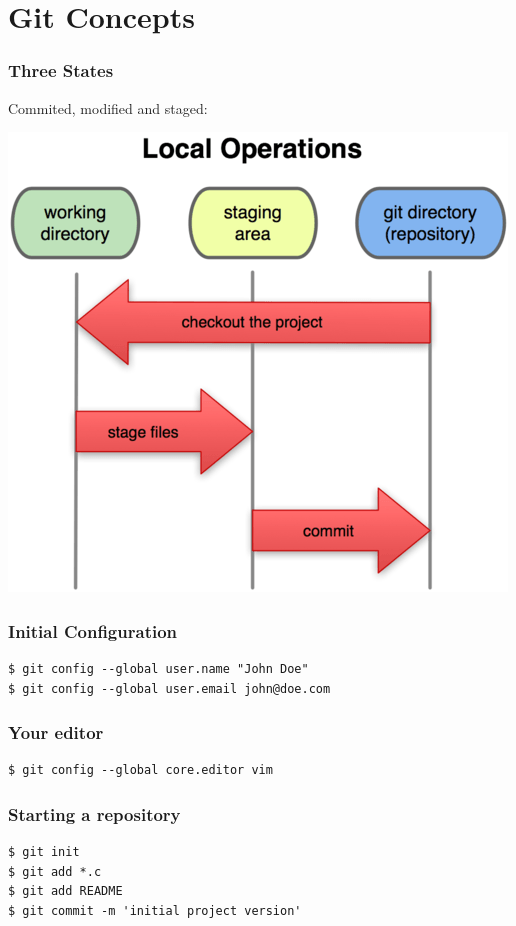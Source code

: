 \documentclass{beamer}
\begin{document}
\section{Git Concepts}

\begin{frame}
\frametitle{Three States}
Commited, modified and staged:
\begin{center}
  \includegraphics[width=\textwidth,height=0.6\textheight,keepaspectratio]{imgs/states.png}
\end{center}
\end{frame}

\begin{frame}[fragile]
\frametitle{Initial Configuration}
\begin{lstlisting}
$ git config --global user.name "John Doe"
$ git config --global user.email john@doe.com
\end{lstlisting}
\end{frame}

\begin{frame}[fragile]
\frametitle{Your editor}
\begin{lstlisting}
$ git config --global core.editor vim
\end{lstlisting}
\end{frame}

\begin{frame}[fragile]
\frametitle{Starting a repository}
\begin{lstlisting}
$ git init
$ git add *.c
$ git add README
$ git commit -m 'initial project version'
\end{lstlisting}
\end{frame}
\end{document}
